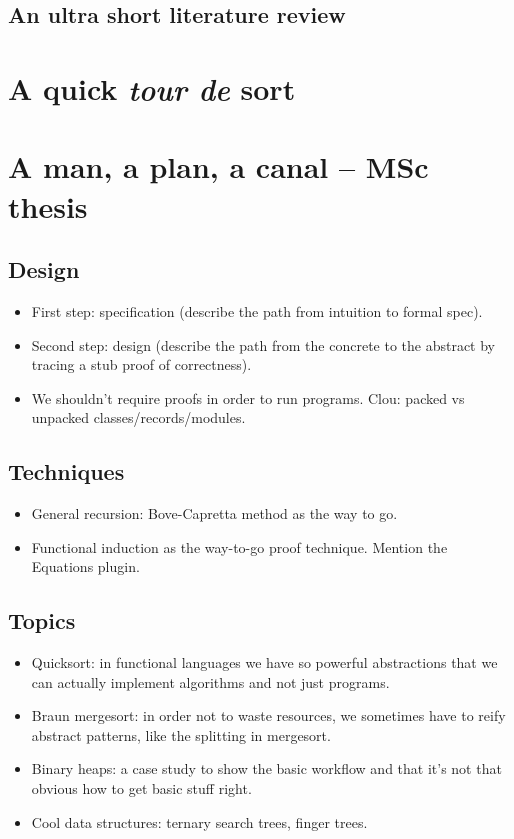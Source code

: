\documentclass[declaration,mgr,english,shortabstract]{iithesis}
\begin{document}
\section{An ultra short literature review} \label{ch1s6}

\chapter{A quick \textit{tour de} sort} \label{ch2}


\chapter{A man, a plan, a canal -- MSc thesis}

\section{Design}
\begin{itemize}
    \item First step: specification (describe the path from intuition to formal spec).
    \item Second step: design (describe the path from the concrete to the abstract by tracing a stub proof of correctness).
    \item We shouldn't require proofs in order to run programs. Clou: packed vs unpacked classes/records/modules.
\end{itemize}

\section{Techniques}
\begin{itemize}
    \item General recursion: Bove-Capretta method as the way to go.
    \item Functional induction as the way-to-go proof technique. Mention the Equations plugin.
\end{itemize}

\section{Topics}
\begin{itemize}
    \item Quicksort: in functional languages we have so powerful abstractions that we can actually implement \*algorithms\* and not just programs.
    \item  Braun mergesort: in order not to waste resources, we sometimes have to reify abstract patterns, like the splitting in mergesort.
    \item Binary heaps: a case study to show the basic workflow and that it's not that obvious how to get basic stuff right.
    \item Cool data structures: ternary search trees, finger trees.
\end{itemize}
\end{document}
